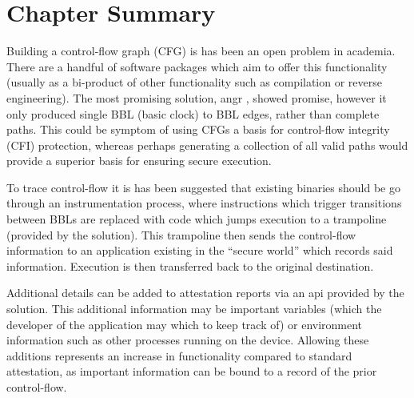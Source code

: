 \section{Chapter Summary}
Building a control-flow graph (CFG) is has been an open problem in academia. There are a handful of software packages which aim to offer this functionality (usually as a bi-product of other functionality such as compilation or reverse engineering). The most promising solution, angr \cite{Shoshitaishvili2016}, showed promise, however it only produced single BBL (basic clock) to BBL edges, rather than complete paths. This could be symptom of using CFGs a basis for control-flow integrity (CFI) protection, whereas perhaps generating a collection of all valid paths would provide a superior basis for ensuring secure execution.

To trace control-flow it is has been suggested that existing binaries should be go through an instrumentation process, where instructions which trigger transitions between BBLs are replaced with code which jumps execution to a trampoline (provided by the solution). This trampoline then sends the control-flow information to an application existing in the ``secure world'' which records said information. Execution is then transferred back to the original destination.

Additional details can be added to attestation reports via an api provided by the solution. This additional information may be important variables (which the developer of the application may which to keep track of) or environment information such as other processes running on the device. Allowing these additions represents an increase in functionality compared to standard attestation, as important information can be bound to a record of the prior control-flow.